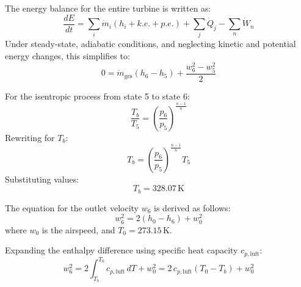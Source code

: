 The energy balance for the entire turbine is written as:  
\[
\frac{dE}{dt} = \sum_i \dot{m}_i \left( h_i + k.e. + p.e. \right) + \sum_j \dot{Q}_j - \sum_n \dot{W}_n
\]  
Under steady-state, adiabatic conditions, and neglecting kinetic and potential energy changes, this simplifies to:  
\[
0 = \dot{m}_{\text{ges}} \left( h_6 - h_5 \right) + \frac{w_6^2 - w_5^2}{2}
\]  

For the isentropic process from state 5 to state 6:  
\[
\frac{T_b}{T_5} = \left( \frac{p_6}{p_5} \right)^{\frac{n-1}{n}}
\]  
Rewriting for \( T_b \):  
\[
T_b = \left( \frac{p_6}{p_5} \right)^{\frac{n-1}{n}} T_5
\]  
Substituting values:  
\[
T_b = 328.07 \, \text{K}
\]

The equation for the outlet velocity \( w_6 \) is derived as follows:  
\[
w_6^2 = 2 \left( h_0 - h_6 \right) + w_0^2
\]  
where \( w_0 \) is the airspeed, and \( T_0 = 273.15 \, \text{K} \).  

Expanding the enthalpy difference using specific heat capacity \( c_{p,\text{luft}} \):  
\[
w_6^2 = 2 \int_{T_b}^{T_0} c_{p,\text{luft}} \, dT + w_0^2 = 2 \, c_{p,\text{luft}} \left( T_0 - T_b \right) + w_0^2
\]